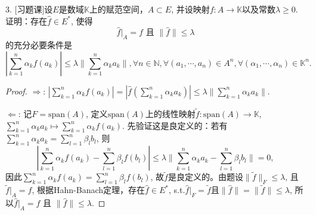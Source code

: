 \documentclass[a4paper,8pt]{ctexart}\textwidth 140mm \textheight 216mm
\newcommand{\8}{\infty}
\newcommand{\RA}{\Rightarrow}
\newcommand{\LA}{\Leftarrow}
\begin{document}
3. [习题课]设$E$是数域$\mathbb{K}$上的赋范空间，$A\subset E$, 并设映射$f:A\to \mathbb{K}$以及常数$\lambda\geq 0$. 证明：存在$\hat{f}\in E^*$, 使得
$$\hat{f}|_A=f\mbox{ 且 }\|\hat{f}\|\leq\lambda$$
的充分必要条件是
\begin{equation*}
|\sum_{k=1}^n\alpha_k f(a_k)|\leq\lambda\|\sum_{k=1}^n\alpha_ka_k\|,\forall n\in\mathbb{N},\forall (a_1,\cdots,a_n)\in A^n,\forall(\alpha_1,\cdots,\alpha_n)\in\mathbb{K}^n.
\end{equation*}
\begin{proof}
	$\RA$: $|\sum_{k=1}^n\alpha_k f(a_k)|=|\hat{f}(\sum_{k=1}^n\alpha_k a_k)|\leq\lambda\|\sum_{k=1}^n\alpha_k a_k\|$.
	
	$\LA$: 记$F=\mathrm{span}(A)$, 定义$\mathrm{span}(A)$上的线性映射$\tilde{f}:\mathrm{span}(A)\to\mathbb{K}$, $\sum_{k=1}^n \alpha_k a_k\mapsto \sum_{k=1}^n\alpha_kf(a_k)$. 先验证这是良定义的：若有$\sum_{k=1}^n\alpha_k a_k=\sum_{l=1}^n \beta_lb_l$, 则
	$$|\sum_{k=1}^n\alpha_kf(a_k)-\sum_{l=1}^n\beta_lf(b_l)|\leq\lambda\|\sum_{k=1}^n\alpha_ka_k-\sum_{l=1}^n\beta_lb_l\|=0,$$
	因此$\sum_{k=1}^n\alpha_kf(a_k)=\sum_{l=1}^n\beta_lf(b_l)$, 故$\tilde{f}$是良定义的。由题设$\|\tilde{f}\|_F\leq\lambda$, 且$\tilde{f}|_A=f$, 根据Hahn-Banach定理，存在$\hat{f}\in E^*$, s.t.$\hat{f}|_F=\tilde{f}$且$\|\hat{f}\|=\|\tilde{f}\|\leq \lambda$, 所以$\hat{f}|_A=f\mbox{ 且 }\|\hat{f}\|\leq\lambda$.
\end{proof}
\end{document}
